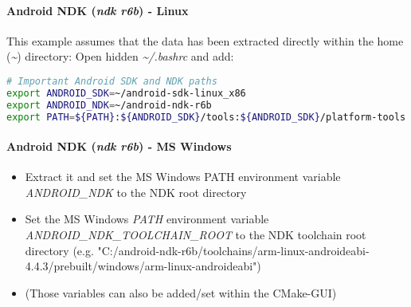 \paragraph{Android NDK (\emph{ndk r6b}) - Linux}
This example assumes that the data has been extracted directly within the home (\emph{\textasciitilde}) directory: Open hidden \emph{\textasciitilde /.bashrc} and add:
\begin{lstlisting}[language=bash]
# Important Android SDK and NDK paths
export ANDROID_SDK=~/android-sdk-linux_x86
export ANDROID_NDK=~/android-ndk-r6b
export PATH=${PATH}:${ANDROID_SDK}/tools:${ANDROID_SDK}/platform-tools:~/${ANDROID_NDK}
\end{lstlisting}


\paragraph{Android NDK (\emph{ndk r6b}) - MS Windows}
\begin{itemize}
\item{Extract it and set the MS Windows PATH environment variable \emph{ANDROID\_NDK} to the NDK root directory}
\item{Set the MS Windows \emph{PATH} environment variable \emph{ANDROID\_NDK\_TOOLCHAIN\_ROOT} to the NDK toolchain root directory (e.g. "C:/android-ndk-r6b/toolchains/arm-linux-androideabi-4.4.3/prebuilt/windows/arm-linux-androideabi")}
\item{(Those variables can also be added/set within the CMake-GUI)}
\end{itemize}


